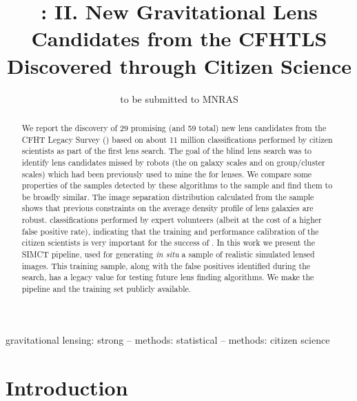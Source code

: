 \documentclass[useAMS,usenatbib,a4paper]{mn2e}
\title[New Gravitational Lens Candidates from CFHTLS]
{\SW: II. New Gravitational Lens Candidates from the CFHTLS Discovered
through Citizen Science}
\author[More et al.]{%
 
}
\begin{document}
\date{to be submitted to MNRAS}
\pagerange{\pageref{firstpage}--\pageref{lastpage}}

\maketitle

\label{firstpage}


\begin{abstract}
We report the discovery of 29 promising (and 59 total) new lens
candidates from the CFHT Legacy Survey (\cfhtls) based on about 11
million classifications performed by citizen scientists as part of the
first \sw lens search.  The goal of the blind lens search was to
identify lens candidates missed by robots (the \rf on galaxy scales and
\af on group/cluster scales) which had been previously used to mine the
\cfhtls for lenses.  We compare some properties of the samples detected
by these algorithms to the \sw sample and find them to be broadly
similar.  The image separation distribution calculated from the \sw
sample shows that previous constraints on the average density profile of
lens galaxies are robust. 
classifications performed by expert volunteers (albeit at the cost of a
higher false positive rate), indicating that the training and
performance calibration of the citizen scientists is very important for
the success of \sw. In this work we present the SIMCT pipeline, used for
generating {\it in situ} a sample of realistic  simulated lensed images.
This training sample, along with the false positives identified during
the search, has a legacy value for testing future lens finding
algorithms. We make the pipeline and the training set publicly available.
\end{abstract}

\begin{keywords}
  gravitational lensing: strong   --
  methods: statistical            --
  methods: citizen science
\end{keywords}

\setcounter{footnote}{1}


\section{Introduction}
\label{sec:intro}
\end{document}
